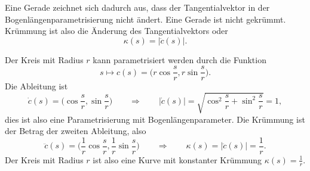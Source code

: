 Eine Gerade zeichnet sich dadurch aus, dass der Tangentialvektor in
der Bogenlängenparametrisierung nicht ändert.
Eine Gerade ist nicht gekrümmt.
Krümmung ist also die Änderung des Tangentialvektors oder
\[
\kappa(s)=|\ddot c(s)|.
\]

\begin{beispiel}
Der Kreis mit Radius $r$ kann parametrisiert werden durch die Funktion
\[
s\mapsto c(s)=\biggl( r\cos\frac{s}{r}, r\sin\frac{s}{r}\biggr).
\]
Die Ableitung ist
\[
\dot c(s)=\biggl(\cos\frac{s}{r},\sin\frac{s}{r}\biggr)
\qquad\Rightarrow\qquad
|\dot c(s)|
=
\sqrt{\cos^2\frac{s}{r}+\sin^2\frac{s}{r}}=1,
\]
dies ist also eine Parametrisierung mit Bogenlängenparameter.
Die Krümmung ist der Betrag der zweiten Ableitung, also
\[
\ddot c(s)=\biggl(\frac1r\cos\frac{s}{r},\frac1r\sin\frac{s}{r}\biggr)
\qquad\Rightarrow\qquad
\kappa(s)
=
|\ddot c(s)|
=
\frac1r.
\]
Der Kreis mit Radius $r$ ist also eine Kurve mit konstanter Krümmung
$\kappa(s)=\frac1r$.
\end{beispiel}

